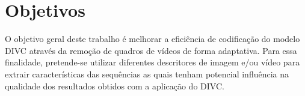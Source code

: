 

\section{Objetivos}






O objetivo geral deste trabalho é melhorar a eficiência de codificação do modelo \ac{DIVC} através da remoção de quadros de vídeos de forma adaptativa. 
Para essa finalidade, pretende-se utilizar diferentes descritores de imagem e/ou vídeo para extrair características das sequências as quais tenham potencial influência na qualidade dos resultados obtidos com a aplicação do \ac{DIVC}.


